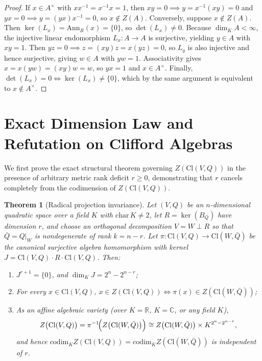 \documentclass[11pt,a4paper]{article}
\newtheorem{theorem}{Theorem}[section]
\theoremstyle{definition}
\theoremstyle{remark}
\newcommand{\Cl}{\mathrm{Cl}}
\newcommand{\Ann}{\mathrm{Ann}}
\newcommand{\codim}{\mathrm{codim}}
\begin{document}
\begin{proof}
If $x \in A^\times$ with $x x^{-1} = x^{-1} x = 1$, then $xy = 0 \implies y = x^{-1}(xy) = 0$ and $yx = 0 \implies y = (yx)x^{-1} = 0$, so $x \notin Z(A)$. Conversely, suppose $x \notin Z(A)$. Then $\ker(L_x) = \Ann_R(x) = \{0\}$, so $\det(L_x) \neq 0$. Because $\dim_K A < \infty$, the injective linear endomorphism $L_x : A \to A$ is surjective, yielding $y \in A$ with $xy = 1$. Then $yz = 0 \implies z = (xy)z = x(yz) = 0$, so $L_y$ is also injective and hence surjective, giving $w \in A$ with $yw = 1$. Associativity gives $x = x(yw) = (xy)w = w$, so $yx = 1$ and $x \in A^\times$. Finally, $\det(L_x) = 0 \iff \ker(L_x) \neq \{0\}$, which by the same argument is equivalent to $x \notin A^\times$.
\end{proof}

\section{Exact Dimension Law and Refutation on Clifford Algebras}

We first prove the exact structural theorem governing $Z(\Cl(V, Q))$ in the presence of arbitrary metric rank deficit $r \ge 0$, demonstrating that $r$ cancels completely from the codimension of $Z(\Cl(V, Q))$.

\begin{theorem}[Radical projection invariance]\label{thm:radical}
Let $(V, Q)$ be an $n$-dimensional quadratic space over a field $K$ with $\mathrm{char}\,K \neq 2$, let $R = \ker(B_Q)$ have dimension $r$, and choose an orthogonal decomposition $V = W \perp R$ so that $\bar{Q} = Q|_W$ is nondegenerate of rank $k = n - r$. Let $\pi : \Cl(V, Q) \to \Cl(W, \bar{Q})$ be the canonical surjective algebra homomorphism with kernel $J = \Cl(V, Q)\cdot R\cdot \Cl(V, Q)$. Then:
\begin{enumerate}
\setlength{\itemsep}{2pt}\setlength{\parskip}{0pt}
\item[(i)] $J^{r+1} = \{0\}$, and $\dim_K J = 2^n - 2^{n-r}$;
\item[(ii)] For every $x \in \Cl(V, Q)$, $x \in Z(\Cl(V, Q)) \iff \pi(x) \in Z(\Cl(W, \bar{Q}))$;
\item[(iii)] As an affine algebraic variety (over $K = \mathbb{R}$, $K = \mathbb{C}$, or any field $K$),
\[
Z\bigl(\Cl(V, Q)\bigr) = \pi^{-1}\!\Bigl(Z\bigl(\Cl(W, \bar{Q})\bigr)\Bigr)
\cong Z\bigl(\Cl(W, \bar{Q})\bigr) \times K^{2^n - 2^{n-r}},
\]
and hence $\codim_K Z(\Cl(V, Q)) = \codim_K Z(\Cl(W, \bar{Q}))$ is independent of $r$.
\end{enumerate}
\end{theorem}
\end{document}

